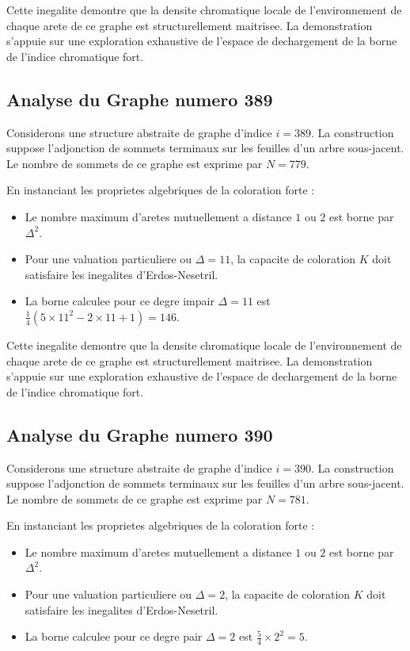 \documentclass[11pt,a4paper]{article}
\begin{document}
Cette inegalite demontre que la densite chromatique locale de l'environnement de chaque arete de ce graphe est structurellement maitrisee. La demonstration s'appuie sur une exploration exhaustive de l'espace de dechargement de la borne de l'indice chromatique fort.

\subsection{Analyse du Graphe numero 389}
Considerons une structure abstraite de graphe d'indice $i = 389$. La construction suppose l'adjonction de sommets terminaux sur les feuilles d'un arbre sous-jacent. Le nombre de sommets de ce graphe est exprime par $N = 779$.

En instanciant les proprietes algebriques de la coloration forte :
\begin{itemize}
\item Le nombre maximum d'aretes mutuellement a distance $1$ ou $2$ est borne par $\Delta^2$.
\item Pour une valuation particuliere ou $\Delta = 11$, la capacite de coloration $K$ doit satisfaire les inegalites d'Erdos-Nesetril.
\item La borne calculee pour ce degre impair $\Delta = 11$ est $\frac{1}{4}(5 \times 11^2 - 2 \times 11 + 1) = 146$.
\end{itemize}

Cette inegalite demontre que la densite chromatique locale de l'environnement de chaque arete de ce graphe est structurellement maitrisee. La demonstration s'appuie sur une exploration exhaustive de l'espace de dechargement de la borne de l'indice chromatique fort.

\subsection{Analyse du Graphe numero 390}
Considerons une structure abstraite de graphe d'indice $i = 390$. La construction suppose l'adjonction de sommets terminaux sur les feuilles d'un arbre sous-jacent. Le nombre de sommets de ce graphe est exprime par $N = 781$.

En instanciant les proprietes algebriques de la coloration forte :
\begin{itemize}
\item Le nombre maximum d'aretes mutuellement a distance $1$ ou $2$ est borne par $\Delta^2$.
\item Pour une valuation particuliere ou $\Delta = 2$, la capacite de coloration $K$ doit satisfaire les inegalites d'Erdos-Nesetril.
\item La borne calculee pour ce degre pair $\Delta = 2$ est $\frac{5}{4} \times 2^2 = 5$.
\end{itemize}
\end{document}
